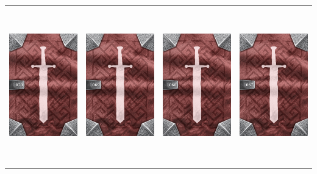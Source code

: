 \documentclass{minimal}
\begin{document}
{\begin{longtable}{llll}
\includegraphics[width=44mm,height=68mm]{./64-151/gh-070-second-chance-ring-back.png} &
\includegraphics[width=44mm,height=68mm]{./64-151/gh-069-star-earring-back.png} &
\includegraphics[width=44mm,height=68mm]{./64-151/gh-068-halberd-back.png} &
\includegraphics[width=44mm,height=68mm]{./64-151/gh-067-balanced-blade-back.png}\\ 

\end{longtable}}
\end{document}
